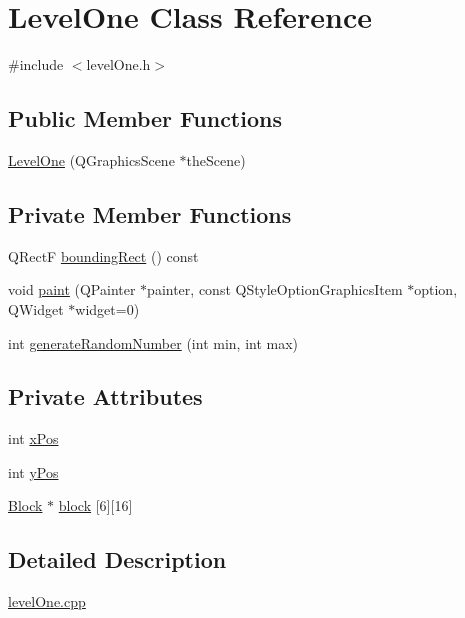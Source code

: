 \hypertarget{class_level_one}{
\section{LevelOne Class Reference}
\label{class_level_one}
}


{\ttfamily \#include $<$levelOne.h$>$}\subsection*{Public Member Functions}
\begin{DoxyCompactItemize}
\item 
\hyperlink{class_level_one_a659fc1089dee490f34ebb490bd3db699}{LevelOne} (QGraphicsScene $\ast$theScene)
\end{DoxyCompactItemize}
\subsection*{Private Member Functions}
\begin{DoxyCompactItemize}
\item 
QRectF \hyperlink{class_level_one_a3a02de10455bcfbbd8994807dd23bf05}{boundingRect} () const 
\item 
void \hyperlink{class_level_one_a20ac2bcc6833dde6e650f953434a84e2}{paint} (QPainter $\ast$painter, const QStyleOptionGraphicsItem $\ast$option, QWidget $\ast$widget=0)
\item 
int \hyperlink{class_level_one_ad130fe4bb9582fdaaef1e14a3e00d381}{generateRandomNumber} (int min, int max)
\end{DoxyCompactItemize}
\subsection*{Private Attributes}
\begin{DoxyCompactItemize}
\item 
int \hyperlink{class_level_one_a5648c256a2bfb5c8f6519227dc14a92a}{xPos}
\item 
int \hyperlink{class_level_one_a6d4af1a9d37892b01d2b193963432325}{yPos}
\item 
\hyperlink{class_block}{Block} $\ast$ \hyperlink{class_level_one_aaca223888bdff2ad013abbd0bc4f672e}{block} \mbox{[}6\mbox{]}\mbox{[}16\mbox{]}
\end{DoxyCompactItemize}


\subsection{Detailed Description}
\hyperlink{level_one_8cpp}{levelOne.cpp}

